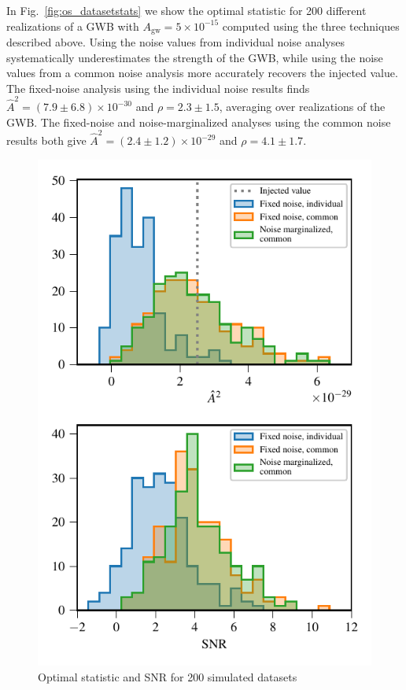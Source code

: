 \documentclass[twocolumn,aps,prd,superscriptaddress]{revtex4-1}
\newcommand{\Agw}{\ensuremath{A_\mathrm{gw}}}
\begin{document}
In Fig.~\ref{fig:os_datasetstats} we show the optimal statistic 
for 200 different realizations of a GWB with $\Agw = 5\times10^{-15}$ 
computed using the three techniques described above. 
Using the noise values from individual noise analyses 
systematically underestimates the strength of the GWB, 
while using the noise values from a common noise analysis 
more accurately recovers the injected value. 
The fixed-noise analysis using the individual noise results finds 
$\hat{A}^2 = (7.9 \pm 6.8) \times10^{-30}$ and $\rho = 2.3 \pm 1.5$, 
averaging over realizations of the GWB. 
The fixed-noise and noise-marginalized analyses 
using the common noise results both give 
$\hat{A}^2 = (2.4\pm1.2)\times10^{-29}$ and $\rho = 4.1 \pm 1.7$.

\begin{figure}[tb]
	\includegraphics[width=0.9\columnwidth]{plots/optstat_A5e-15.pdf}
	\caption{Optimal statistic and SNR for 200 simulated datasets 
}
\end{figure}
\end{document}
